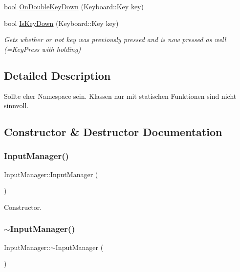 \begin{DoxyCompactItemize}
bool \mbox{\hyperlink{class_input_manager_a1e80afe2aecb16c9a9b45a111b7f83a5}{On\+Double\+Key\+Down}} (Keyboard\+::\+Key key)
\item 
bool \mbox{\hyperlink{class_input_manager_acf3316661127cbdda5f0bd09cdc46a43}{Is\+Key\+Down}} (Keyboard\+::\+Key key)
\begin{DoxyCompactList}\small\item\em Gets whether or not key was previously pressed and is now pressed as well (=Key\+Press with holding) \end{DoxyCompactList}\end{DoxyCompactItemize}


\subsection{Detailed Description}
Sollte eher Namespace sein. Klassen nur mit statischen Funktionen sind nicht sinnvoll. 

\subsection{Constructor \& Destructor Documentation}
\mbox{\label{class_input_manager_a8be46886da639b26d67181c29dab6d6c}} 
\subsubsection{\texorpdfstring{Input\+Manager()}{InputManager()}}
{\footnotesize\ttfamily Input\+Manager\+::\+Input\+Manager (\begin{DoxyParamCaption}{ }\end{DoxyParamCaption})}



Constructor. 

\mbox{\label{class_input_manager_af518290877dd183606709d5852db5491}} 
\subsubsection{\texorpdfstring{$\sim$\+Input\+Manager()}{~InputManager()}}
{\footnotesize\ttfamily Input\+Manager\+::$\sim$\+Input\+Manager (\begin{DoxyParamCaption}{ }\end{DoxyParamCaption})}



